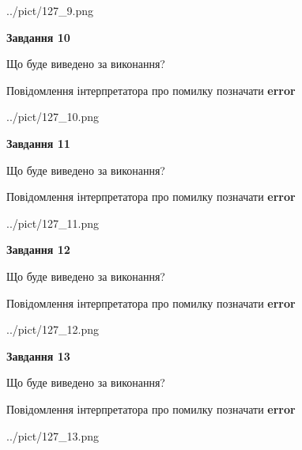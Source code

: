 \documentclass[11pt, ukrainian]{article}
\begin{document}
{\begin {large}
\begin{center}
	{../pict/127_9.png}
\end{center}
\newpage

{\begin {center}\textbf{Завдання 10}\end {center}}\par
Що буде виведено за виконання? \par
Повідомлення інтерпретатора про помилку позначати \textbf{error}

\begin{center}
	{../pict/127_10.png}
\end{center}
\newpage

{\begin {center}\textbf{Завдання 11}\end {center}}\par
Що буде виведено за виконання? \par
Повідомлення інтерпретатора про помилку позначати \textbf{error}

\begin{center}
	{../pict/127_11.png}
\end{center}
\newpage

{\begin {center}\textbf{Завдання 12}\end {center}}\par
Що буде виведено за виконання? \par
Повідомлення інтерпретатора про помилку позначати \textbf{error}

\begin{center}
	{../pict/127_12.png}
\end{center}
\newpage

{\begin {center}\textbf{Завдання 13}\end {center}}\par
Що буде виведено за виконання? \par
Повідомлення інтерпретатора про помилку позначати \textbf{error}

\begin{center}
	{../pict/127_13.png}
\end{center}
\newpage


\end{large}}
\end{document}
